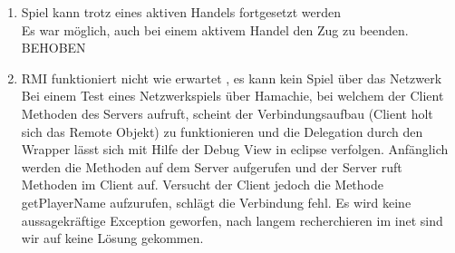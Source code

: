 \documentclass[a4paper,10pt]{article}
\begin{document}
\begin{enumerate}
\item Spiel kann trotz eines aktiven Handels fortgesetzt werden
\\Es war möglich, auch bei einem aktivem Handel den Zug zu beenden. BEHOBEN
\item RMI funktioniert nicht wie erwartet , es kann kein Spiel über das Netzwerk 
\\Bei einem Test eines Netzwerkspiels über Hamachie, bei welchem der Client Methoden des Servers aufruft,
 scheint der Verbindungsaufbau (Client holt sich das Remote Objekt) zu funktionieren und die Delegation durch den Wrapper lässt 
 sich mit Hilfe der Debug View in eclipse verfolgen. Anfänglich werden die Methoden auf dem Server aufgerufen und der Server ruft Methoden im Client auf.
 Versucht der Client jedoch die Methode getPlayerName aufzurufen, schlägt die Verbindung fehl. Es wird keine aussagekräftige Exception geworfen, nach langem recherchieren im inet sind wir auf keine Lösung gekommen.
\end{enumerate}
\end{document}
